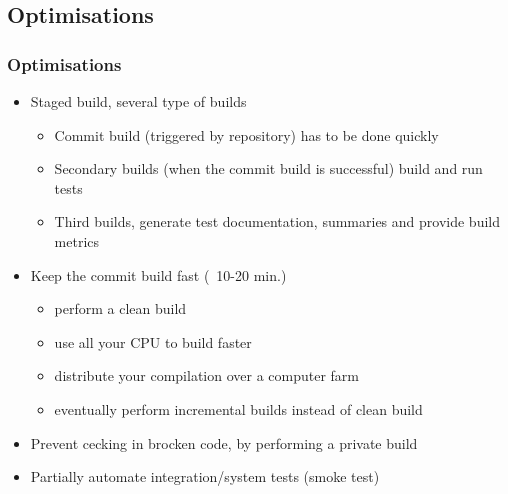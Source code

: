 \documentclass{beamer}
\begin{document}
\subsection[Optimisations]{Optimisations}

\begin{frame}
\frametitle{Optimisations}
\begin{itemize}
	\item<1-> Staged build, several type of builds\cite{Fowler06}
		\begin{itemize}
          \item<2-> Commit build (triggered by repository) has to be done
          quickly
          \item<3-> Secondary builds (when the commit build is successful) build
          and run tests
          \item<4-> Third builds, generate test documentation, summaries and
          provide build metrics\cite{Duvall07}
        \end{itemize}
    \item<5-> Keep the commit build fast\cite{Duvall07} (~10-20 min.)
    \begin{itemize}
      \item perform a clean build
      \item use all your CPU to build faster
      \item distribute your compilation over a computer farm\cite{Pool09}
      \item eventually perform incremental builds instead of clean build
    \end{itemize}
    \item<6-> Prevent cecking in brocken code, by performing a private
    build\cite{Duvall07}
    \item<7-> Partially automate integration/system tests (smoke
    test)\cite{Berczuk03}
\end{itemize}
\end{frame}
\end{document}
